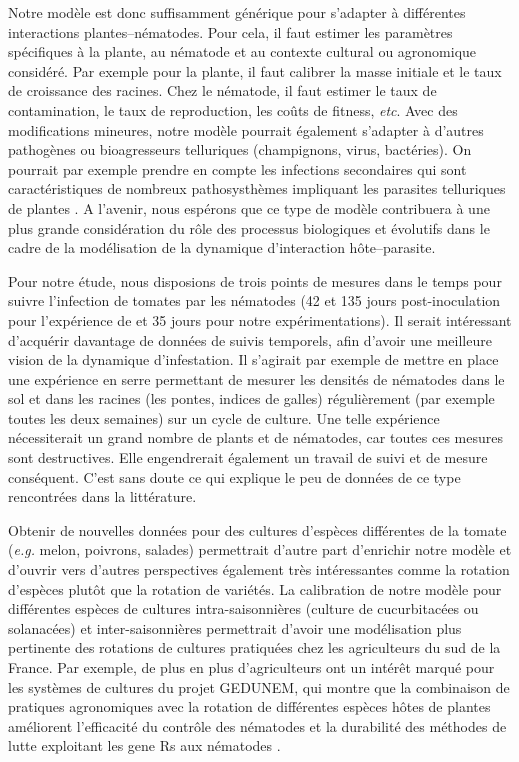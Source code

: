 	Notre  modèle est donc suffisamment  générique pour  s'adapter à différentes interactions plantes--nématodes.
Pour cela, il faut estimer   les paramètres spécifiques à la plante, au nématode et au contexte cultural ou agronomique considéré. Par exemple pour  la plante, il faut calibrer  la masse initiale et le taux de croissance des racines. Chez le nématode, il faut  estimer le taux de contamination, le taux de reproduction, les coûts de fitness, \textit{etc}.   Avec des modifications mineures, notre modèle pourrait  également s'adapter à d'autres pathogènes ou bioagresseurs telluriques (champignons, virus, bactéries).   On pourrait par exemple prendre en compte les infections secondaires qui sont caractéristiques de nombreux pathosysthèmes impliquant les parasites telluriques de plantes  \citep{Cunniffe2011,Mailleret2012}. A l'avenir, nous espérons que ce type de modèle contribuera à une plus grande
considération du rôle des processus biologiques et évolutifs dans le cadre de la modélisation de la dynamique d'interaction  hôte--parasite.
	
	     
	Pour notre étude, nous disposions de trois points de mesures dans le temps pour suivre l'infection de tomates par les nématodes (42  et 135 jours post-inoculation pour l'expérience de \citet{Ehwaeti1998} et 35 jours pour notre expérimentations). Il serait intéressant d'acquérir davantage de données de suivis temporels, afin d'avoir une meilleure vision de la dynamique d'infestation. 
Il s'agirait par exemple de mettre en place une expérience en serre permettant de mesurer les densités de nématodes dans le sol et dans les racines (les pontes, indices de galles) régulièrement (par exemple toutes les deux semaines)  sur  un cycle de culture. Une  telle expérience  nécessiterait un grand nombre de plants et de nématodes, car toutes ces mesures sont destructives. Elle engendrerait également un travail de suivi et de mesure conséquent. C'est sans doute ce qui explique le peu de données de ce type rencontrées dans la littérature.
	 
	Obtenir de nouvelles  données pour des cultures d'espèces différentes de la tomate (\textit{e.g.} melon, poivrons, salades)  permettrait d'autre part d'enrichir notre modèle et d'ouvrir vers d'autres perspectives également très intéressantes comme la rotation d'espèces plutôt que la rotation de variétés. La calibration  de notre modèle pour différentes espèces de cultures intra-saisonnières  (culture de cucurbitacées ou solanacées) et  inter-saisonnières permettrait d'avoir une modélisation plus pertinente des rotations  de cultures  pratiquées chez les agriculteurs du sud de la France. 
Par exemple, de plus en plus d'agriculteurs ont un intérêt marqué pour les systèmes de cultures du projet  \gls{GEDUNEM}, qui montre que la combinaison de pratiques agronomiques avec la rotation de différentes espèces hôtes de plantes  améliorent l’efficacité du contrôle des nématodes et la durabilité des méthodes de lutte exploitant les \glspl{gene R} aux nématodes \citep{Djian-Caporalino2019}. 
	 
